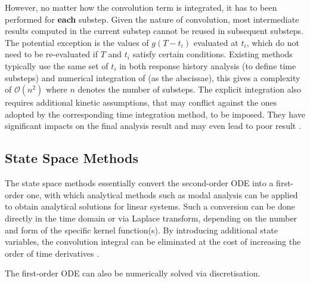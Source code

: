 However, no matter how the convolution term is integrated, it has to been performed for \textbf{each} substep. Given the nature of convolution, most intermediate results computed in the current substep cannot be reused in subsequent substeps. The potential exception is the values of $g(T-t_i)$ evaluated at $t_i$, which do not need to be re-evaluated if $T$ and $t_i$ satisfy certain conditions. Existing methods typically use the same set of $t_i$ in both response history analysis (to define time substeps) and numerical integration of  (as the abscissae), this gives a complexity of $\mathcal{O}\left(n^2\right)$ where $n$ denotes the number of substeps. The explicit integration also requires additional kinetic assumptions, that may conflict against the ones adopted by the corresponding time integration method, to be imposed. They have significant impacts on the final analysis result \citep[see][]{Liu2014} and may even lead to poor result \cite[see][Figs. 12, 17, 25, 26]{Liu2023}.
\subsection{State Space Methods}
The state space methods essentially convert the second-order ODE into a first-order one, with which analytical methods such as modal analysis can be applied to obtain analytical solutions for linear systems. Such a conversion can be done directly in the time domain or via Laplace transform, depending on the number and form of the specific kernel function(s). By introducing additional state variables, the convolution integral can be eliminated at the cost of increasing the order of time derivatives \citep[see, e.g.,][]{Wu2019}.

The first-order ODE can also be numerically solved via discretisation.